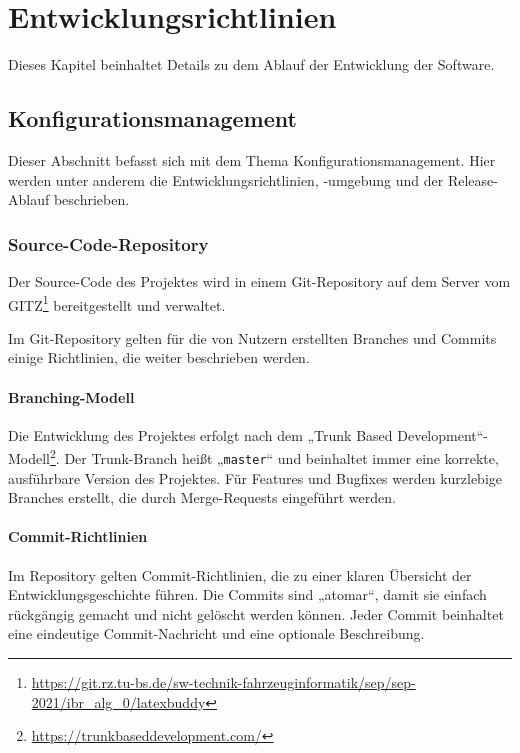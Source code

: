 \documentclass{article}
\begin{document}
\chapter{Entwicklungsrichtlinien}

Dieses Kapitel beinhaltet Details zu dem Ablauf der Entwicklung der Software.


\section{Konfigurationsmanagement}

Dieser Abschnitt befasst sich mit dem Thema Konfigurationsmanagement. Hier werden unter anderem die Entwicklungsrichtlinien, -umgebung und der Release-Ablauf beschrieben.

\subsection{Source-Code-Repository}\label{angebot:entwicklungsrichtlinien:scm}

Der Source-Code des Projektes wird in einem Git-Repository auf dem Server vom GITZ\footnote{\url{https://git.rz.tu-bs.de/sw-technik-fahrzeuginformatik/sep/sep-2021/ibr_alg_0/latexbuddy}} bereitgestellt und verwaltet.

Im Git-Repository gelten für die von Nutzern erstellten Branches und Commits einige Richtlinien, die weiter beschrieben werden.

\subsubsection{Branching-Modell}

Die Entwicklung des Projektes erfolgt nach dem „Trunk Based Development“-Modell\footnote{\url{https://trunkbaseddevelopment.com/}}. Der Trunk-Branch heißt „\texttt{master}“ und beinhaltet immer eine korrekte, ausführbare Version des Projektes. Für Features und Bugfixes werden kurzlebige Branches erstellt, die durch Merge-Requests eingeführt werden.

\subsubsection{Commit-Richtlinien}

Im Repository gelten Commit-Richtlinien, die zu einer klaren Übersicht der Entwicklungsgeschichte führen. Die Commits sind „atomar“, damit sie einfach rückgängig gemacht und nicht gelöscht werden können. Jeder Commit beinhaltet eine eindeutige Commit-Nachricht und eine optionale Beschreibung.
\end{document}
